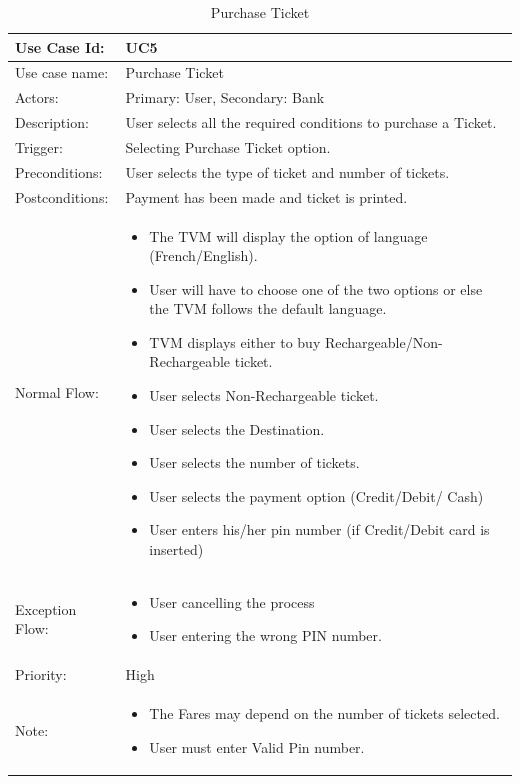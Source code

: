 \documentclass[11pt,oneside]{book}
\begin{document}
\begin{table}[h]
\centering
\begin{tabular}{|p{2.4cm}|p{11cm}|}
\hline
{Use Case Id: } & {UC5} \\
\hline
{Use case name:} & {Purchase Ticket}\\
\hline
{Actors: } & {Primary: User, Secondary: Bank}\\
\hline
{Description:} & {User selects all the required conditions to purchase a Ticket.}\\
\hline
 
{Trigger:  } & {Selecting Purchase Ticket option.}\\
\hline
{Preconditions:  } & User selects the type of ticket and number of tickets.\\
\hline
{Postconditions:} & {Payment has been made and ticket is printed.}\\
\hline
{Normal Flow: } & {
\begin{itemize}
\item	The TVM will display the option of language (French/English).
\item	User will have to choose one of the two options or else the TVM follows the default language.
\item	TVM displays either to buy Rechargeable/Non-Rechargeable ticket.
\item	User selects Non-Rechargeable ticket.
\item	User selects the Destination.
\item	User selects the number of tickets.
\item	User selects the payment option (Credit/Debit/ Cash)
\item	User enters his/her pin number (if Credit/Debit card is inserted)

 
\end{itemize}
}\\
\hline
{Exception Flow: } & {
\begin{itemize}
\item	User cancelling the process
\item	User entering the wrong PIN number.

\end{itemize}
}\\
\hline
{Priority:  } & {High}\\
\hline
{Note:  } & {
\begin{itemize}
\item	The Fares may depend on the number of tickets selected.
\item	User must enter Valid Pin number.
\end{itemize}
}\\
\hline
\end{tabular}
\caption{Purchase Ticket}
\end{table}
\end{document}
